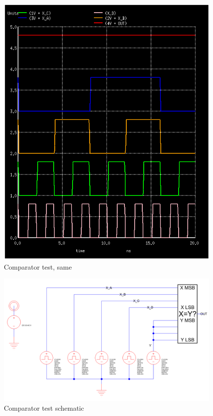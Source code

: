 \documentclass[12pt]{report}
\begin{document}
\begin{figure}[H]
  \centering
    \includegraphics[width=1.0\textwidth]{comparator_test_same.PNG}
  \caption{Comparator test, same}
  \label{fig:comparator_test_same}
\end{figure}
\begin{figure}[H]
  \centering
    \includegraphics[width=1.0\textwidth]{TestSchematics/comparator.PNG}
  \caption{Comparator test schematic}
\end{figure}
\end{document}

